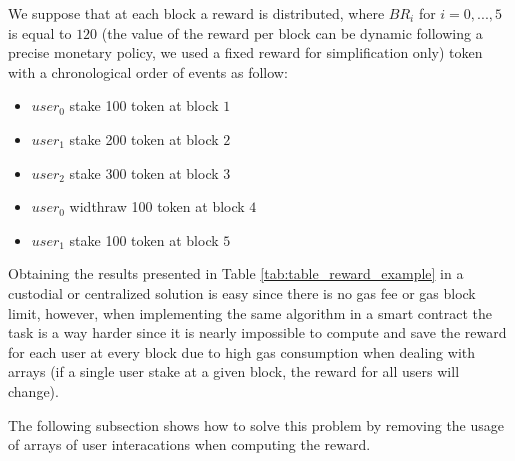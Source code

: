 \documentclass[a4paper]{article}
\begin{document}
\noindent
We suppose that at each block a reward is distributed, where $\mathit{BR}_i$ for $i=0,...,5$ is equal to $120$ (the value of the reward per block can be dynamic following a precise monetary policy, we used a fixed reward for simplification only) \acrshort{token} with a chronological order of events as follow:
\begin{itemize}
  \setlength\itemsep{0.1em}
  \item $user_0$ stake 100 \acrshort{token} at block $1$
  \item $user_1$ stake 200 \acrshort{token} at block $2$
  \item $user_2$ stake 300 \acrshort{token} at block $3$
  \item $user_0$ widthraw 100 \acrshort{token} at block $4$
  \item $user_1$ stake 100 \acrshort{token} at block $5$
\end{itemize}
\noindent
Obtaining the results presented in Table \ref{tab:table_reward_example} in a custodial or centralized solution is easy since there is no gas fee or gas block limit, however, when implementing the same algorithm in a smart contract the task is a way harder since it is nearly impossible to compute and save the reward for each user at every block due to high gas consumption when dealing with arrays (if a single user stake at a given block, the reward for all users will change).\par
\noindent
The following subsection shows how to solve this problem by removing the usage of arrays of user interacations when computing the reward.\par
\end{document}
